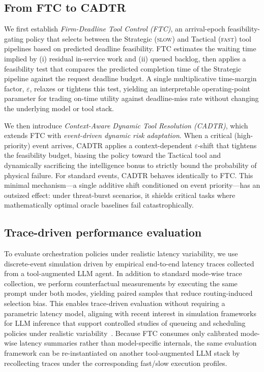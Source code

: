 \documentclass[preprint,12pt]{elsarticle}
\begin{document}
\subsection{From FTC to CADTR}
We first establish \emph{Firm-Deadline Tool Control (FTC)}, an arrival-epoch
feasibility-gating policy that selects between the Strategic (\textsc{slow})
and Tactical (\textsc{fast}) tool pipelines based on predicted deadline
feasibility. FTC estimates the waiting time implied by (i) residual in-service
work and (ii) queued backlog, then applies a feasibility test that compares
the predicted completion time of the Strategic pipeline against the request
deadline budget. A single multiplicative time-margin factor,
$\varepsilon$, relaxes or tightens this test, yielding an interpretable 
operating-point parameter for trading on-time utility against deadline-miss
rate without changing the underlying model or tool stack.

We then introduce \emph{Context-Aware Dynamic Tool Resolution (CADTR)}, which extends FTC with \emph{event-driven dynamic risk adaptation}. When a critical (high-priority) event arrives, CADTR applies a context-dependent $\varepsilon$-shift that tightens the feasibility budget, biasing the policy toward the Tactical tool and dynamically sacrificing the intelligence bonus to strictly bound the probability of physical failure. For standard events, CADTR behaves identically to FTC. This minimal mechanism---a single additive shift conditioned on event priority---has an outsized effect: under threat-burst scenarios, it shields critical tasks where mathematically optimal oracle baselines fail catastrophically.

\subsection{Trace-driven performance evaluation}
To evaluate orchestration policies under realistic latency variability,
we use discrete-event simulation driven by empirical end-to-end latency 
traces collected from a tool-augmented LLM agent. In addition to standard
mode-wise trace collection, we perform counterfactual measurements
by executing the same prompt under both modes, yielding paired 
samples that reduce routing-induced selection bias. This enables 
trace-driven evaluation without requiring a parametric latency 
model, aligning with recent interest in simulation frameworks 
for LLM inference that support controlled studies of queueing and
scheduling policies under realistic variability~\cite{agrawal2024vidur}. 
Because FTC consumes only calibrated mode-wise latency summaries rather
than model-specific internals, the same evaluation framework can be 
re-instantiated on another tool-augmented LLM stack by recollecting traces 
under the corresponding fast/slow execution profiles.
\end{document}
